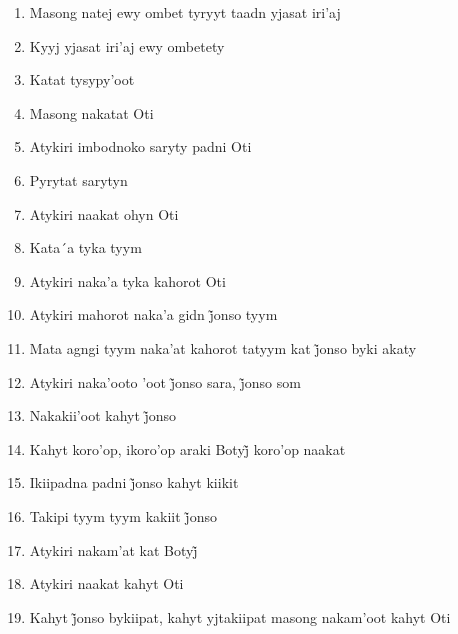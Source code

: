 \begin{enumerate}
 \item Masong natej ewy ombet tyryyt taadn yjasat iri'aj

 \item Kyyj yjasat iri'aj ewy ombetety

 \item Katat tysypy'oot

 \begin{center}\end{center}

 \item Masong nakatat Oti

 \item Atykiri imbodnoko saryty padni Oti

 \item Pyrytat sarytyn

 \item Atykiri naakat ohyn Oti

 \item Kata´a tyka tyym

 \item Atykiri naka'a tyka kahorot Oti

 \begin{center}\end{center}

 \item Atykiri mahorot naka’a gidn j̃onso tyym

 \item Mata agngi tyym naka’at kahorot tatyym kat j̃onso byki akaty

 \item Atykiri naka’ooto ’oot j̃onso sara, j̃onso som

 \item Nakakii’oot kahyt j̃onso

 \item Kahyt koro’op, ikoro’op araki Botyj̃ koro’op naakat

 \item Ikiipadna padni j̃onso kahyt kiikit

 \item Takipi tyym tyym kakiit j̃onso

 \item Atykiri nakam’at kat Botyj̃

 \item Atykiri naakat kahyt Oti

 \item Kahyt j̃onso bykiipat, kahyt yjtakiipat masong nakam’oot kahyt Oti
 \end{enumerate}

